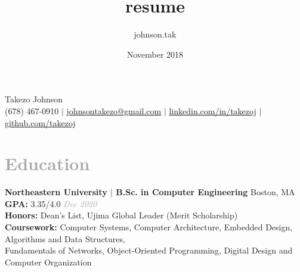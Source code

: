 \documentclass{article}
\title{resume}
\author{johnson.tak }
\date{November 2018}
\newcommand\HUGE{\fontsize{20}{48}\selectfont}
\begin{document}
\thispagestyle{empty}

{\selectfont	%

\titleformat{\section}{\Large}{}{0em}{}{}
\titleformat{\subsection}{}{}{0em}{}{}

\renewcommand{\maketitle}{
\begin{center}
{\HUGE Takezo Johnson}\\
\vspace{1em}
\faMobilePhone{ }(678) 467-0910 $\mid$ 
\href{mailto:johnsontakezo@gmail.com}{\faSend{ }johnsontakezo@gmail.com} $\mid$ 
\href{https://www.linkedin.com/in/takezoj}{\faLinkedinSquare{ }linkedin.com/in/takezoj} $\mid$ 
\href{https://www.github.com/takezoj}{\faGithub{ }github.com/takezoj}
\end{center}}

\newenvironment{myitemize}
{ \begin{itemize}
    \setlength{\itemsep}{0pt}
    \setlength{\parskip}{0pt}
    \setlength{\parsep}{0pt}}
{ \end{itemize}} 

\maketitle

\section[Education \hfill]{\textcolor{darkgray}{Education \sout{\hfill}}}
    {\bfseries\large Northeastern University $\mid$ B.Sc. in Computer Engineering} \hfill Boston, MA\\
    {\bfseries GPA:} 3.35/4.0 \hfill\textit{\textcolor{darkgray}{Dec 2020}}\\
    {\bfseries Honors:} Dean's List, Ujima Global Leader (Merit Scholarship)\\
    {\bfseries Coursework:} Computer Systems, Computer Architecture, Embedded Design, Algorithms and Data Structures,\\ Fundamentals of Networks, Object-Oriented Programming, Digital Design and Computer Organization

}
\end{document}
